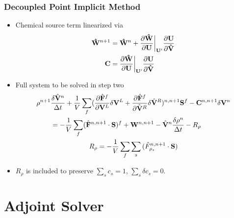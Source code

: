 \documentclass{beamer}
\begin{document}
\begin{frame}
  \frametitle{Decoupled Point Implicit Method}
  \begin{itemize}
    \item Chemical source term linearized via
    \begin{align*}
      \mathbf{\hat{W}}^{n+1} &= \mathbf{\hat{W}}^n+\frac{\partial
      \mathbf{\hat{W}}}{\partial \mathbf{U}}\bigg|_{\mathbf{U}'} \frac{\partial
      \mathbf{U}}{\partial \mathbf{\hat{V}}} \\
       \mathbf C &= \frac{\partial \mathbf{\hat{W}}}{\partial
       \mathbf{U}}\bigg|_{\mathbf{U}'} \frac{\partial \mathbf{U}}{\partial
       \mathbf{\hat{V}}}
    \end{align*}
    \item Full system to be solved in step two
    \begin{gather*}
      \begin{split} \rho^{n+1}&\frac{\delta \hat{\mathbf V}^n}{\Delta t}
        +\frac{1}{V}\sum\limits_{f}(\frac{\partial \hat{\mathbf F}^f}{\partial
        \mathbf V^L}\delta \mathbf V^L +\frac{\partial
        \hat{\mathbf F}^f}{\partial \hat{\mathbf V}^R}\delta
        \hat{\mathbf V}^R)^{n, n+1}\mathbf S^f - \mathbf C^{n, n+1}\delta\mathbf V^n \\ &=
        -\frac{1}{V}\sum\limits_{f}(\hat{\mathbf F}^{n,n+1}\cdot\mathbf S)^f +
        \mathbf W^{n, n+1} -\hat{\mathbf V}^n\frac{\delta \rho^n}{\Delta t} - R_\rho 
      \end{split} \\ 
      R_\rho = -\frac{1}{V}\sum\limits_{f}{\sum\limits_{s}
      {(\hat{F}_{\rho_s}^{n,n+1}\cdot\mathbf{S})}}
    \end{gather*}
  \item $R_\rho$ is included to preserve $\sum\limits_{s}{c_s}=1$, $\sum\limits_{s}{\delta c_s}=0$.
  \end{itemize}
\end{frame}

\section{Adjoint Solver}
\end{document}
